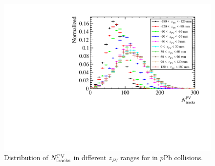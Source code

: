 \begin{figure}[!tbp]
\begin{center}
\includegraphics[width=0.7\linewidth]{pdf/pPb/Workdir/PVZvsMul/Jpsi.pdf}
\end{center}
\caption{
    Distribution of $N_{\rm tracks}^{\rm PV}$ in different $z_{PV}$ ranges for \jpsi in $p$Pb collisions.}
\label{JpsiPVZ}
\end{figure}

